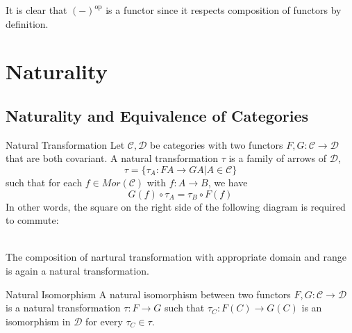 \documentclass[a4paper]{article}
\begin{document}
It is clear that $(-)^\text{op}$ is a functor since it respects composition of functors by definition. 

\pagebreak
\section{Naturality}
\subsection{Naturality and Equivalence of Categories}
\begin{defn}{Natural Transformation}{} Let $\mathcal{C},\mathcal{D}$ be categories with two functors $F,G:\mathcal{C}\to\mathcal{D}$ that are both covariant. A natural transformation $\tau$ is a family of arrows of $\mathcal{D}$, $$\tau=\{\tau_A:FA\to GA|A\in\mathcal{C}\}$$ such that for each $f\in Mor(\mathcal{C})$ with $f:A\to B$, we have 
$$G(f)\circ\tau_A=\tau_B\circ F(f)$$ In other words, the square on the right side of the following diagram is required to commute: \\~\\
\end{defn}

\begin{prp}{}{} The composition of nartural transformation with appropriate domain and range is again a natural transformation. 
\end{prp}

\begin{defn}{Natural Isomorphism}{} A natural isomorphism between two functors $F,G:\mathcal{C}\to\mathcal{D}$ is a natural transformation $\tau:F\to G$ such that $\tau_C:F(C)\to G(C)$ is an isomorphism in $\mathcal{D}$ for every $\tau_C\in\tau$. 
\end{defn}
\end{document}
